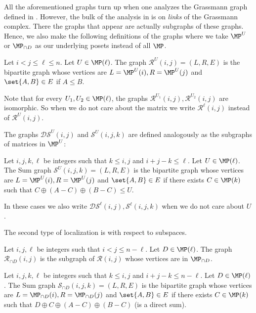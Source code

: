 All the aforementioned graphs turn up when one analyzes the Grassmann graph defined in . However, the bulk of the analysis in  is on \emph{links} of the Grassmann complex. There the graphs that appear are actually subgraphs of these graphs. Hence, we also make the following definitions of the graphs where we take \(\MP^{U}\) or \(\MP_{\cap D}\) as our underlying posets instead of all \(\MP\).

\begin{definition}
    Let \(i < j \leq \ell \leq n\). Let \(U \in \MP(\ell)\). The graph \(\mathcal{R}^{U}(i,j) = (L,R,E)\) is the bipartite graph whose vertices are \(L=\MP^{U}(i), R=\MP^{U}(j)\) and \(\set{A,B} \in E\) if \(A \leq B\).
\end{definition}
Note that for every \(U_1,U_2 \in \MP(\ell)\), the graphs \(\mathcal{R}^{U_1}(i,j),\mathcal{R}^{U_2}(i,j)\) are isomorphic. So when we do not care about the matrix we write \(\mathcal{R}^{\ell}(i,j)\) instead of \(\mathcal{R}^{U}(i,j)\). 

The graphs \(\mathcal{DS}^{U}(i,j)\) and \(\mathcal{S}^{U}(i,j,k)\) are defined analogously as the subgraphs of matrices in \(\MP^{U}\):
\begin{definition} \label{def:upper-bounded-sum-graph}
    Let \(i,j,k,\ell\) be integers such that \(k \leq i,j\) and \(i+j-k \leq \ell\). Let \(U \in \MP(\ell)\). The Sum graph \(\mathcal{S}^U(i,j,k) = (L,R,E)\) is the bipartite graph whose vertices are \(L=\MP^U(i), R=\MP^U(j)\) and \(\set{A,B} \in E\) if there exists \(C \in \MP(k)\) such that \(C \oplus (A-C) \oplus (B-C) \leq U\).
\end{definition}
In these cases we also write \(\mathcal{DS}^\ell(i,j), \mathcal{S}^\ell(i,j,k)\) when we do not care about \(U\).

The second type of localization is with respect to subspaces. 

\begin{definition}
    Let \(i,j,\ell\) be integers such that \(i < j \leq n-\ell\). Let \(D \in \MP(\ell)\). The graph \(\mathcal{R}_{\cap D}(i,j)\) is the subgraph of \(\mathcal{R}(i,j)\) whose vertices are in \(\MP_{\cap D}\).
\end{definition}

\begin{definition}\label{def:lower-bounded-sum-graph}
    Let \(i,j,k,\ell\) be integers such that \(k \leq i,j\) and \(i+j-k \leq n-\ell\). Let \(D \in \MP(\ell)\). The Sum graph \(\mathcal{S}_{\cap D}(i,j,k) = (L,R,E)\) is the bipartite graph whose vertices are \(L=\MP_{\cap D}(i), R=\MP_{\cap D}(j)\) and \(\set{A,B} \in E\) if there exists \(C \in \MP(k)\) such that \(D \oplus C \oplus (A-C) \oplus (B-C)\) (is a direct sum).
\end{definition}


